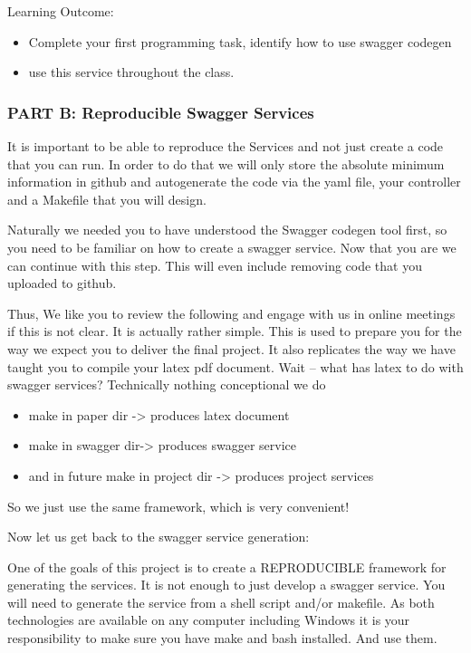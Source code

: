 Learning Outcome:

\begin{itemize}
\item Complete your first programming task, identify how to use
  swagger codegen
\item use this service throughout the class.
\end{itemize}

\subsubsection{PART B: Reproducible Swagger Services}

\begin{exercise}
It is important to be able to reproduce the Services and not just
create a code that you can run. In order to do that we will only store
the absolute minimum information in github and autogenerate the code
via the yaml file, your controller and a Makefile that you will
design.

Naturally we needed you to have understood the Swagger codegen tool
first, so you need to be familiar on how to create a swagger service.
Now that you are we can continue with this step. This will even
include removing code that you uploaded to github.

Thus, We like you to review the following and engage with us in online
meetings if this is not clear. It is actually rather simple. This is
used to prepare you for the way we expect you to deliver the final
project. It also replicates the way we have taught you to compile your
latex pdf document. Wait -- what has latex to do with swagger services?
Technically nothing conceptional we do

 
\begin{itemize}
\item make in paper dir -> produces latex document

\item make in swagger dir-> produces swagger service

\item and in future make in project dir -> produces project services
\end{itemize}
 

So we just use the same framework, which is very convenient!

Now let us get back to the swagger service generation:
 
One of the goals of this project is to create a REPRODUCIBLE framework
for generating the services. It is not enough to just develop a
swagger service. You will need to generate the service from a shell
script and/or makefile. As both technologies are available on any
computer including Windows it is your responsibility to make sure you
have make and bash installed. And use them.


\end{exercise}
